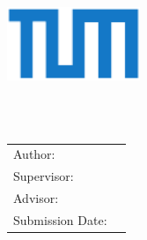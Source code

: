 \begin{titlepage}
  \centering

  \vspace{40mm}
  \includegraphics[width=40mm]{./figures/tum}

  \vspace{5mm}
  {\LARGE \MakeUppercase{\getUniversity{}}}\\

  \vspace{5mm}
  {\Large \MakeUppercase{\getFaculty{}}}\\

  \vspace{20mm}
  {\Large \getDoctype{}}

  \vspace{15mm}
  {\huge\bfseries \getTitle{}}

  \vspace{10mm}
  {\huge\bfseries \getTitleGer{}}

  \vspace{15mm}
  \begin{tabular}{l l}
    Author: & \getAuthor{} \\
    Supervisor: & \getSupervisor{} \\
    Advisor: & \getAdvisor{} \\
    Submission Date: & \getSubmissionDate{} \\
  \end{tabular}

  \vspace{20mm}
\end{titlepage}
